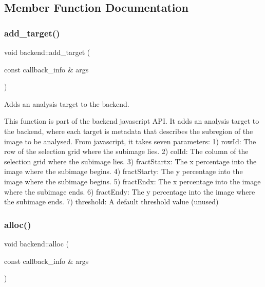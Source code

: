 \subsection{Member Function Documentation}
\mbox{\label{classbackend_ac981fabc3077c133dca35b5cb7e6f66c}} 
\subsubsection{\texorpdfstring{add\+\_\+target()}{add\_target()}}
{\footnotesize\ttfamily void backend\+::add\+\_\+target (\begin{DoxyParamCaption}\item[{const callback\+\_\+info \&}]{args }\end{DoxyParamCaption})\hspace{0.3cm}{\ttfamily [static]}}



Adds an analysis target to the backend. 

This function is part of the backend javascript A\+PI. It adds an analysis target to the backend, where each target is metadata that describes the subregion of the image to be analysed. From javascript, it takes seven parameters\+: 1) row\+Id\+: The row of the selection grid where the subimage lies. 2) col\+Id\+: The column of the selection grid where the subimage lies. 3) fract\+Startx\+: The x percentage into the image where the subimage begins. 4) fract\+Starty\+: The y percentage into the image where the subimage begins. 5) fract\+Endx\+: The x percentage into the image where the subimage ends. 6) fract\+Endy\+: The y percentage into the image where the subimage ends. 7) threshold\+: A default threshold value (unused) \mbox{\label{classbackend_a9e8157df648d308880c4ec62adc426fb}} 
\subsubsection{\texorpdfstring{alloc()}{alloc()}}
{\footnotesize\ttfamily void backend\+::alloc (\begin{DoxyParamCaption}\item[{const callback\+\_\+info \&}]{args }\end{DoxyParamCaption})\hspace{0.3cm}{\ttfamily [static]}}



